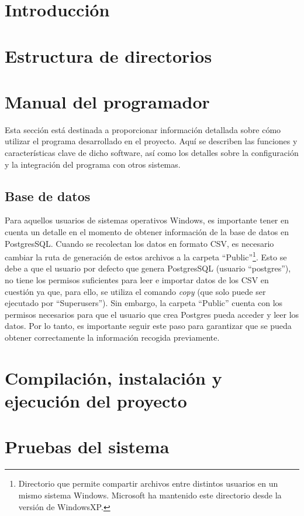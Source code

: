 
\section{Introducción}



\section{Estructura de directorios}

\section{Manual del programador}

Esta sección está destinada a proporcionar información detallada sobre cómo utilizar el programa desarrollado en el proyecto. Aquí se describen las funciones y características clave de dicho software, así como los detalles sobre la configuración y la integración del programa con otros sistemas.

\subsection{Base de datos}
Para aquellos usuarios de sistemas operativos Windows, es importante tener en cuenta un detalle en el momento de obtener información de la base de datos en PostgresSQL. Cuando se recolectan los datos en formato CSV, es necesario cambiar la ruta de generación de estos archivos a la carpeta ``Public''\footnote{Directorio que permite compartir archivos entre distintos usuarios en un mismo sistema Windows. Microsoft ha mantenido este directorio desde la versión de WindowsXP.}. Esto se debe a que el usuario por defecto que genera PostgresSQL (usuario ``postgres''), no tiene los permisos suficientes para leer e importar datos de los CSV en cuestión ya que, para ello, se utiliza el comando \textit{copy} (que solo puede ser ejecutado por ``Superusers'')\cite{Dominguez2020}. Sin embargo, la carpeta ``Public'' cuenta con los permisos necesarios para que el usuario que crea Postgres pueda acceder y leer los datos. Por lo tanto, es importante seguir este paso para garantizar que se pueda obtener correctamente la información recogida previamente.


\section{Compilación, instalación y ejecución del proyecto}

\section{Pruebas del sistema}
